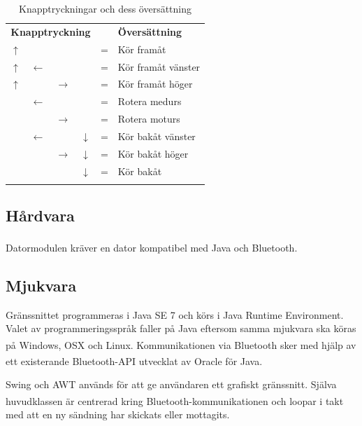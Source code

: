\documentclass[11pt]{article}
\begin{document}
\begin{flushleft}
\begin{longtable}{|p{.05\linewidth} p{.05\linewidth} p{.05\linewidth} p{.05\linewidth} c l|}
	\multicolumn{4}{c}{\textbf{Knapptryckning}} & & \multicolumn{1}{l}{\textbf{Översättning}} 	\\ \nobreakhline\nobreakhline 
	$\uparrow$ &  				&  				& 				& = & Kör framåt 				\\ \nobreakhline 
	$\uparrow$ & $\leftarrow$	&				&				& = & Kör framåt vänster 		\\ \nobreakhline 
	$\uparrow$ &				& $\rightarrow$	&				& = & Kör framåt höger 			\\ \nobreakhline 
			   & $\leftarrow$	&				&				& = & Rotera medurs 			\\ \nobreakhline
			   &				& $\rightarrow$	&				& = & Rotera moturs 			\\ \nobreakhline
			   & $\leftarrow$	&				& $\downarrow$	& = & Kör bakåt vänster 		\\ \nobreakhline
			   &				& $\rightarrow$ & $\downarrow$	& = & Kör bakåt höger 			\\ \nobreakhline
			   &				&				& $\downarrow$	& = & Kör bakåt 				\\ \nobreakhline
	\caption{Knapptryckningar och dess översättning} \label{datormodul:combinations}
\end{longtable}



\subsection{Hårdvara}
Datormodulen kräver en dator kompatibel med Java och Bluetooth\textsuperscript{\circledR}. 

\subsection{Mjukvara}
Gränssnittet programmeras i Java SE 7 och körs i Java Runtime Environment. Valet av programmeringsspråk faller på Java eftersom samma mjukvara ska köras på Windows, OSX och Linux. Kommunikationen via Bluetooth\textsuperscript{\circledR} sker med hjälp av ett existerande Bluetooth\textsuperscript{\circledR}-API utvecklat av Oracle för Java. 

Swing och AWT används för att ge användaren ett grafiskt gränssnitt. Själva huvudklassen är centrerad kring Bluetooth\textsuperscript{\circledR}-kommunikationen och loopar i takt med att en ny sändning har skickats eller mottagits. 


\end{flushleft}
\end{document}
